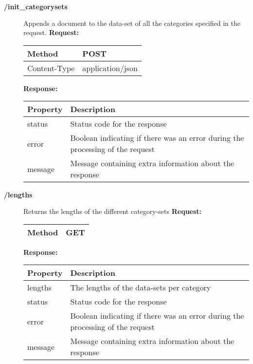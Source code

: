 \begin{description}
\item[{\large \textbf{/init\_categorysets}}]
Appends a document to the data-set of all the categories specified in the request.
\newline
\newline
\textbf{Request:}
\newline
\newline
\begin{tabular}{ | l | l |}
\hline
Method & POST\\ \hline
Content-Type & application/json\\ \hline
\end{tabular}
\newline
\newline
\textbf{Response:}
\newline
\newline
\resizebox{\textwidth}{!} {
\begin{tabular}{ | l | l |}
\hline
\textbf{Property} & \textbf{Description}\\ \hline
status & Status code for the response\\ \hline
error & Boolean indicating if there was an error during the processing of the request\\ \hline
message & Message containing extra information about the response\\ \hline
\end{tabular}}


\item[{\large \textbf{/lengths}}]
Returns the lengths of the different category-sets
\newline
\newline
\textbf{Request:}
\newline
\newline
\begin{tabular}{ | l | l |}
\hline
Method & GET\\ \hline
\end{tabular}
\newline
\newline
\textbf{Response:}
\newline
\newline
\resizebox{\textwidth}{!} {
\begin{tabular}{ | l | l |}
\hline
\textbf{Property} & \textbf{Description}\\ \hline
lengths & The lengths of the data-sets per category\\ \hline
status & Status code for the response\\ \hline
error & Boolean indicating if there was an error during the processing of the request\\ \hline
message & Message containing extra information about the response\\ \hline
\end{tabular}}

\end{description}